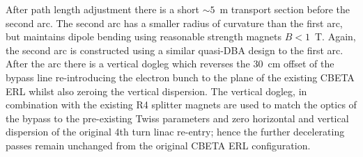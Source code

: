 \documentclass[../main.tex]{subfiles}
\begin{document}
After path length adjustment there is a short $\sim5$~\si{\metre} transport section before the second arc. The second arc has a smaller radius of curvature than the first arc, but maintains dipole bending using reasonable strength magnets $B < 1$~\si{\tesla}. Again, the second arc is constructed using a similar quasi-DBA design to the first arc. After the arc there is a vertical dogleg which reverses the 30~\si{\centi\meter} offset of the bypass line re-introducing the electron bunch to the plane of the existing CBETA ERL whilst also zeroing the vertical dispersion. The vertical dogleg, in combination with the existing R4 splitter magnets are used to match the optics of the bypass to the pre-existing Twiss parameters and zero horizontal and vertical dispersion of the original 4th turn linac re-entry; hence the further decelerating passes remain unchanged from the original CBETA ERL configuration.   
\end{document}
